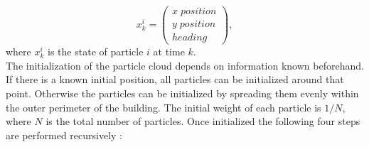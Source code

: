 \begin{equation}
x_k^i = \left(\begin{array}{l}
x \; position \\
y \; position\\
heading
\end{array}\right), 
\label{eq:pf_state}
\end{equation}
where $x^i_k$ is the state of particle $i$ at time $k$.\\
The initialization of the particle cloud depends on information known beforehand. If there is a known initial position, all particles can be initialized around that point. Otherwise the particles can be initialized by spreading them evenly within the outer perimeter of the building. The initial weight of each particle is $1/N$, where $N$ is the total number of particles. Once initialized the following four steps are performed recursively \cite{Wu2019,Woodman2008}: 

